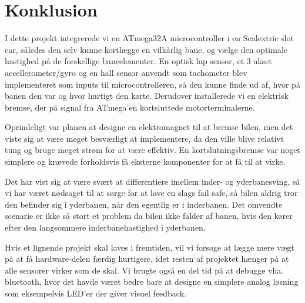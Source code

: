 \section{Konklusion}

I dette projekt integrerede vi en ATmega32A microcontroller i en Scalextric slot car, således den selv kunne kortlægge en vilkårlig bane, og vælge den optimale hastighed på de forskellige baneelementer. En optisk lap sensor, et 3 akset accellerometer/gyro og en hall sensor anvendt som tachometer blev implementeret som inputs til microcontrolleren, så den kunne finde ud af, hvor på banen den var og hvor hurtigt den kørte. Derudover installerede vi en elektrisk bremse, der på signal fra ATmega'en kortsluttede motorterminalerne. \par
Oprindeligt var planen at designe en elektromagnet til at bremse bilen, men det viste sig at være meget besværligt at implementere, da den ville blive relativt tung og bruge meget strøm for at være effektiv. En kortslutningsbremse var noget simplere og krævede forholdsvis få eksterne komponenter for at få til at virke. \par
Det har vist sig at være svært at differentiere imellem inder- og yderbanesving, så vi har været nødsaget til at sørge for at lave en slags fail safe, så bilen aldrig tror den befinder sig i yderbanen, når den egentlig er i inderbanen. Det omvendte scenarie er ikke så stort et problem da bilen ikke falder af banen, hvis den kører efter den langsommere inderbanehastighed i yderbanen.\par
Hvis et lignende projekt skal laves i fremtiden, vil vi forsøge at lægge mere vægt på at få hardware-delen færdig hurtigere, idet resten af projektet hænger på at alle sensorer virker som de skal. Vi brugte også en del tid på at debugge vha. bluetooth, hvor det havde været bedre bare at designe en simplere analog løsning som eksempelvis LED'er der giver visuel feedback.